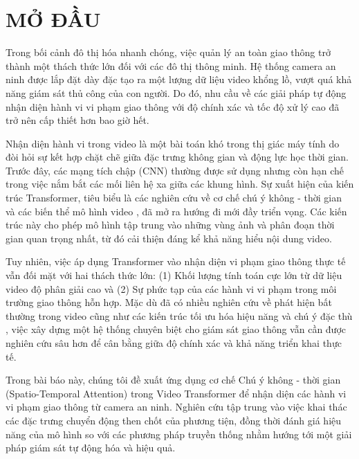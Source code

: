 \section{MỞ ĐẦU}

Trong bối cảnh đô thị hóa nhanh chóng, việc quản lý an toàn giao thông trở thành một thách thức lớn đối với các đô thị thông minh. Hệ thống camera an ninh được lắp đặt dày đặc tạo ra một lượng dữ liệu video khổng lồ, vượt quá khả năng giám sát thủ công của con người. Do đó, nhu cầu về các giải pháp tự động nhận diện hành vi vi phạm giao thông với độ chính xác và tốc độ xử lý cao đã trở nên cấp thiết hơn bao giờ hết.

Nhận diện hành vi trong video là một bài toán khó trong thị giác máy tính do đòi hỏi sự kết hợp chặt chẽ giữa đặc trưng không gian và động lực học thời gian. Trước đây, các mạng tích chập (CNN) thường được sử dụng nhưng còn hạn chế trong việc nắm bắt các mối liên hệ xa giữa các khung hình. Sự xuất hiện của kiến trúc Transformer, tiêu biểu là các nghiên cứu về cơ chế chú ý không - thời gian \cite{c1} và các biến thể mô hình video \cite{c2, c9}, đã mở ra hướng đi mới đầy triển vọng. Các kiến trúc này cho phép mô hình tập trung vào những vùng ảnh và phân đoạn thời gian quan trọng nhất, từ đó cải thiện đáng kể khả năng hiểu nội dung video.

Tuy nhiên, việc áp dụng Transformer vào nhận diện vi phạm giao thông thực tế vẫn đối mặt với hai thách thức lớn: (1) Khối lượng tính toán cực lớn từ dữ liệu video độ phân giải cao và (2) Sự phức tạp của các hành vi vi phạm trong môi trường giao thông hỗn hợp. Mặc dù đã có nhiều nghiên cứu về phát hiện bất thường trong video \cite{c3, c4, c10} cũng như các kiến trúc tối ưu hóa hiệu năng và chú ý đặc thù \cite{c5, c7, c8}, việc xây dựng một hệ thống chuyên biệt cho giám sát giao thông \cite{c6} vẫn cần được nghiên cứu sâu hơn để cân bằng giữa độ chính xác và khả năng triển khai thực tế.

Trong bài báo này, chúng tôi đề xuất ứng dụng cơ chế Chú ý không - thời gian (Spatio-Temporal Attention) trong Video Transformer để nhận diện các hành vi vi phạm giao thông từ camera an ninh. Nghiên cứu tập trung vào việc khai thác các đặc trưng chuyển động then chốt của phương tiện, đồng thời đánh giá hiệu năng của mô hình so với các phương pháp truyền thống nhằm hướng tới một giải pháp giám sát tự động hóa và hiệu quả.

